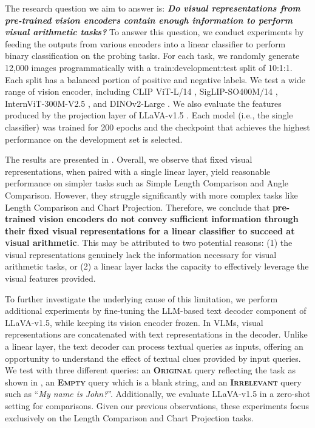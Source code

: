 The research question we aim to answer is: \textbf{\textit{Do visual representations from pre-trained vision encoders contain enough information to perform visual arithmetic tasks?}} To answer this question, we conduct experiments by feeding the outputs from various encoders into a linear classifier to perform binary classification on the probing tasks. For each task, we randomly generate 12,000 images programmatically with a train:development:test split of 10:1:1. Each split has a balanced portion of positive and negative labels. We test a wide range of vision encoder, including  CLIP ViT-L/14 \cite{Radford2021LearningTV}, SigLIP-SO400M/14 \cite{Zhai_2023_siglip}, InternViT-300M-V2.5 \cite{chen2024internvl}, and DINOv2-Large \cite{oquab2024dinov}.%
We also evaluate the features produced by the projection layer of LLaVA-v1.5 \cite{liu2023llava}. Each model (i.e., the single classifier) %
was trained for 200 epochs and the checkpoint that achieves the highest performance on the development set is selected. 



The results are presented in . Overall, we observe that fixed visual representations, when paired with a single linear layer, yield reasonable performance on simpler tasks such as Simple Length Comparison and Angle Comparison. However, they struggle significantly with more complex tasks like Length Comparison and Chart Projection. Therefore, we conclude that \textbf{pre-trained vision encoders do not convey sufficient information through their fixed visual representations for a linear classifier to succeed at visual arithmetic}. This may be attributed to two potential reasons: (1) the visual representations genuinely lack the information necessary for visual arithmetic tasks, or (2) a linear layer lacks the capacity to effectively leverage the visual features provided.


To further investigate the underlying cause of this limitation, we perform additional experiments by fine-tuning the LLM-based text decoder component of LLaVA-v1.5, while keeping its vision encoder frozen. In VLMs, visual representations are concatenated with text representations in the decoder. Unlike a linear layer, the text decoder can process textual queries as inputs, offering an opportunity to understand the effect of textual clues provided by input queries. We test with three different queries: an \textbf{\textsc{Original}} query reflecting the task as shown in , an \textbf{\textsc{Empty}} query which is a blank string, and an \textbf{\textsc{Irrelevant}} query such as ``\textit{My name is John?}''. Additionally, we evaluate LLaVA-v1.5 in a zero-shot setting for comparisons. Given our previous observations, these experiments focus exclusively on the Length Comparison and Chart Projection tasks.



